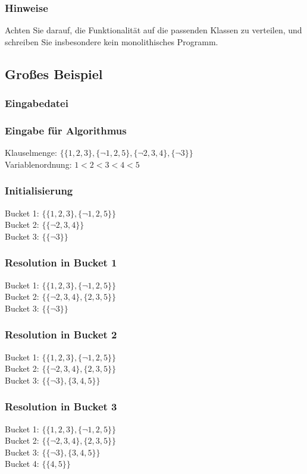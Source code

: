 \documentclass{sdqassignment}
\begin{document}
\subsubsection{Hinweise}
Achten Sie darauf, die Funktionalität auf die passenden Klassen zu verteilen, und schreiben Sie insbesondere kein monolithisches Programm.

\subsection{Großes Beispiel}
\subsubsection{Eingabedatei}

\subsubsection{Eingabe für Algorithmus}
Klauselmenge: $\{ \{1,2,3\}, \{\lnot 1,2,5\}, \{\lnot 2,3,4\}, \{\lnot 3\} \}$ \\
Variablenordnung: $1 < 2 < 3 < 4 < 5$

\subsubsection{Initialisierung}
Bucket 1: $\{ \{1,2,3\}, \{\lnot 1,2,5\} \}$ \\
Bucket 2: $\{ \{ \lnot 2,3,4\} \}$ \\
Bucket 3: $\{ \{ \lnot 3\} \}$

\subsubsection{Resolution in Bucket 1}
Bucket 1: $\{ \{1,2,3\}, \{\lnot 1,2,5\} \}$ \\
Bucket 2: $\{ \{ \lnot 2,3,4\}, \{2,3,5\} \}$ \\
Bucket 3: $\{ \{ \lnot 3\} \}$

\subsubsection{Resolution in Bucket 2}
Bucket 1: $\{ \{1,2,3\}, \{\lnot 1,2,5\} \}$ \\
Bucket 2: $\{ \{ \lnot 2,3,4\}, \{2,3,5\} \}$ \\
Bucket 3: $\{ \{ \lnot 3\}, \{3,4,5\} \}$

\subsubsection{Resolution in Bucket 3}
Bucket 1: $\{ \{1,2,3\}, \{\lnot 1,2,5\} \}$ \\
Bucket 2: $\{ \{ \lnot 2,3,4\}, \{2,3,5\} \}$ \\
Bucket 3: $\{ \{ \lnot 3\}, \{3,4,5\} \}$ \\
Bucket 4: $\{ \{4,5\} \}$
\end{document}
